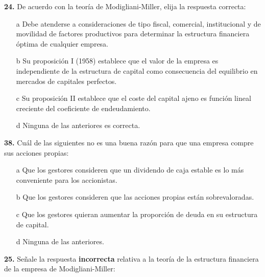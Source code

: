 \documentclass{nuevotema}
\begin{document}
\textbf{24.} De acuerdo con la teoría de Modigliani-Miller, elija la respuesta correcta:

\begin{itemize}
	\item[a] Debe atenderse a consideraciones de tipo fiscal, comercial, institucional y de movilidad de factores productivos para determinar la estructura financiera óptima de cualquier empresa.
	\item[b] Su proposición I (1958) establece que el valor de la empresa es independiente de la estructura de capital como consecuencia del equilibrio en mercados de capitales perfectos.
	\item[c] Su proposición II establece que el coste del capital ajeno es función lineal creciente del coeficiente de endeudamiento.
	\item[d] Ninguna de las anteriores es correcta.
\end{itemize}

\textbf{38.} Cuál de las siguientes no es una buena razón para que una empresa compre sus acciones propias:

\begin{enumerate}
	\item[a] Que los gestores consideren que un dividendo de caja estable es lo más conveniente para los accionistas.
	\item[b] Que los gestores consideren que las acciones propias están sobrevaloradas.
	\item[c] Que los gestores quieran aumentar la proporción de deuda en su estructura de capital.
	\item[d] Ninguna de las anteriores.
\end{enumerate}

\textbf{25.} Señale la respuesta \textbf{incorrecta} relativa a la teoría de la estructura financiera de la empresa de Modigliani-Miller:
\end{document}
